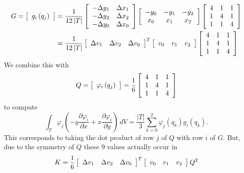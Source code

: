 \documentclass[letterpaper,10pt]{article}
\begin{document}
\begin{align*}
G = \left[ \begin{array}{c} g_i\left(q_j\right) \end{array}\right]
&= \frac{1}{12\left|T\right|} \left[ \begin{array}{c c}
-\Delta y_1 & \Delta x_1 \\
-\Delta y_2 & \Delta x_2 \\
-\Delta y_0 & \Delta x_0
\end{array}\right] \left[ \begin{array}{c c c}
-y_0 & -y_1 & -y_2 \\
x_0 & x_1 & x_2
\end{array}\right] \left[ \begin{array}{c c c}
4 & 1 & 1 \\
1 & 4 & 1 \\
1 & 1 & 4
\end{array}\right] \\
&= \frac{1}{12\left|T\right|} \left[ \begin{array}{c c c}
\Delta v_1 & \Delta v_2 & \Delta v_0
\end{array}\right]^T \left[ \begin{array}{c c c}
v_0 & v_1 & v_2
\end{array}\right] \left[ \begin{array}{c c c}
4 & 1 & 1 \\
1 & 4 & 1 \\
1 & 1 & 4
\end{array}\right]
\end{align*}
We combine this with
\[Q = \left[ \begin{array}{c} \varphi_i\left(q_j\right)
\end{array}\right] =
\frac{1}{6} \left[ \begin{array}{c c c}
4 & 1 & 1 \\
1 & 4 & 1 \\
1 & 1 & 4
\end{array}\right]\]
to compute
\[\int_{T} \varphi_j \left(-y \frac{\partial \varphi_i}{\partial x} +
x \frac{\partial \varphi_i}{\partial y}\right) \, dV =
\frac{\left|T\right|}{3} \sum_{k = 0}^2 \varphi_j(q_k) g_i(q_k).\]
This corresponds to taking the dot product of row \(j\) of \(Q\)
with row \(i\) of \(G\). But, due to the
symmetry of \(Q\) these \(9\) values actually occur in
\[K = \frac{1}{6} \left[ \begin{array}{c c c}
\Delta v_1 & \Delta v_2 & \Delta v_0
\end{array}\right]^T \left[ \begin{array}{c c c}
v_0 & v_1 & v_2
\end{array}\right] Q^2\]
\end{document}

